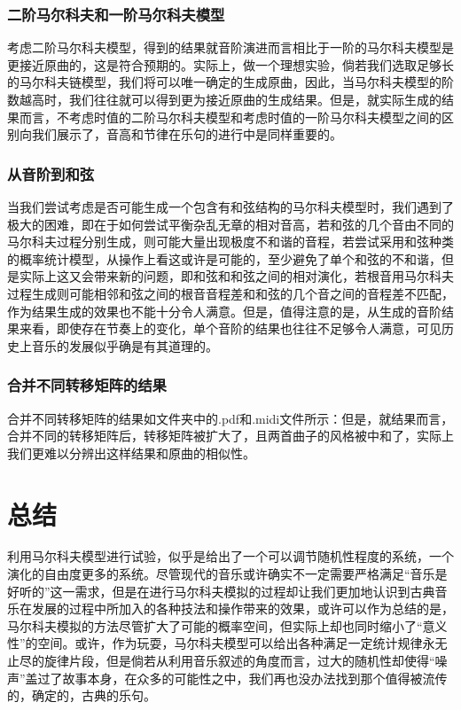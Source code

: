 \documentclass[12pt, a4paper, oneside]{ctexart}
\begin{document}
	\subsubsection{二阶马尔科夫和一阶马尔科夫模型}
	考虑二阶马尔科夫模型，得到的结果就音阶演进而言相比于一阶的马尔科夫模型是更接近原曲的，这是符合预期的。实际上，做一个理想实验，倘若我们选取足够长的马尔科夫链模型，我们将可以唯一确定的生成原曲，因此，当马尔科夫模型的阶数越高时，我们往往就可以得到更为接近原曲的生成结果。但是，就实际生成的结果而言，不考虑时值的二阶马尔科夫模型和考虑时值的一阶马尔科夫模型之间的区别向我们展示了，音高和节律在乐句的进行中是同样重要的。
	
	\subsubsection{从音阶到和弦}
	当我们尝试考虑是否可能生成一个包含有和弦结构的马尔科夫模型时，我们遇到了极大的困难，即在于如何尝试平衡杂乱无章的相对音高，若和弦的几个音由不同的马尔科夫过程分别生成，则可能大量出现极度不和谐的音程，若尝试采用和弦种类的概率统计模型，从操作上看这或许是可能的，至少避免了单个和弦的不和谐，但是实际上这又会带来新的问题，即和弦和和弦之间的相对演化，若根音用马尔科夫过程生成则可能相邻和弦之间的根音音程差和和弦的几个音之间的音程差不匹配，作为结果生成的效果也不能十分令人满意。但是，值得注意的是，从生成的音阶结果来看，即使存在节奏上的变化，单个音阶的结果也往往不足够令人满意，可见历史上音乐的发展似乎确是有其道理的。
	
	\subsubsection{合并不同转移矩阵的结果}
	合并不同转移矩阵的结果如文件夹中的.pdf和.midi文件所示：但是，就结果而言，合并不同的转移矩阵后，转移矩阵被扩大了，且两首曲子的风格被中和了，实际上我们更难以分辨出这样结果和原曲的相似性。
	
	\section{总结}
	利用马尔科夫模型进行试验，似乎是给出了一个可以调节随机性程度的系统，一个演化的自由度更多的系统。尽管现代的音乐或许确实不一定需要严格满足“音乐是好听的”这一需求，但是在进行马尔科夫模拟的过程却让我们更加地认识到古典音乐在发展的过程中所加入的各种技法和操作带来的效果，或许可以作为总结的是，马尔科夫模拟的方法尽管扩大了可能的概率空间，但实际上却也同时缩小了“意义性”的空间。或许，作为玩耍，马尔科夫模型可以给出各种满足一定统计规律永无止尽的旋律片段，但是倘若从利用音乐叙述的角度而言，过大的随机性却使得“噪声”盖过了故事本身，在众多的可能性之中，我们再也没办法找到那个值得被流传的，确定的，古典的乐句。
	
\end{document}
